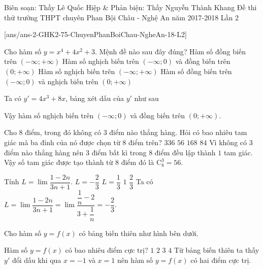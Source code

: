 	\begin{name}
		{Biên soạn: Thầy Lê Quốc Hiệp \& Phản biện: Thầy Nguyễn Thành Khang}
		{Đề thi thử trường THPT chuyên Phan Bội Châu - Nghệ An năm 2017-2018 Lần 2}
	\end{name}
	\setcounter{ex}{0}\setcounter{bt}{0}
	[ans/ans-2-GHK2-75-ChuyenPhanBoiChau-NgheAn-18-L2]
\begin{ex}%
	Cho hàm số $y=x^4+4x^2+3$. Mệnh đề nào sau đây đúng?
	\choice
	{Hàm số đồng biến trên $(-\infty;+\infty)$}
	{\True Hàm số nghịch biến trên $(-\infty;0)$ và đồng biến trên $(0;+\infty)$}
	{Hàm số nghịch biến trên $(-\infty;+\infty)$}
	{Hàm số đồng biến trên $(-\infty;0)$ và nghịch biến trên $(0;+\infty)$}
	\loigiai
	{
		Ta có $y'=4x^3+8x$, bảng xét dấu của $y'$ như sau
		\begin{center}
		\end{center}
	Vậy hàm số nghịch biến trên $(-\infty;0)$ và đồng biến trên $(0;+\infty)$.
	}
\end{ex}

\begin{ex}%
	Cho $8$ điểm, trong đó không có $3$ điểm nào thẳng hàng. Hỏi có bao nhiêu tam giác mà ba đỉnh của nó được chọn từ $8$ điểm trên? 
	\choice
	{$336$}
	{\True $56$}
	{$168$}
	{$84$}
	\loigiai
	{
		Vì không có $3$ điểm nào thẳng hàng nên $3$ điểm bất kì trong $8$ điểm đều lập thành $1$ tam giác.\\
		Vậy số tam giác được tạo thành từ $8$ điểm đó là $\mathrm{C}^3_8=56.$
	}
\end{ex}

\begin{ex}%
	Tính $L=\lim\dfrac{1-2n}{3n+1}$.
	\choice
	{\True $L=-\dfrac{2}{3}$}
	{$L=\dfrac{1}{3}$}
	{$1$}
	{$\dfrac{2}{3}$}
	\loigiai
	{
		Ta có $L=\lim\dfrac{1-2n}{3n+1}=\lim\dfrac{\dfrac{1}{n}-2}{3+\dfrac{1}{n}}=-\dfrac{2}{3}$.
	}
\end{ex}

\begin{ex}%
	Cho hàm số $y=f(x)$ có bảng biến thiên như hình bên dưới.
	\begin{center}
	\end{center}
	Hàm số $y=f(x)$ có bao nhiêu điểm cực trị?
	\choice
	{$1$}
	{\True $2$}
	{$3$}
	{$4$}
	\loigiai
	{
		Từ bảng biến thiên ta thấy $y'$ đổi dấu khi qua $x=-1$ và $x=1$ nên hàm  số $y=f(x)$ có hai điểm cực trị.
	}
\end{ex}

